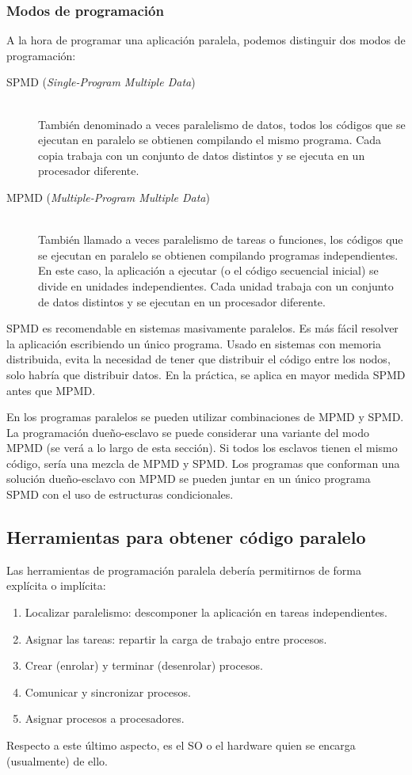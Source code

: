 \subsubsection{Modos de programación}
A la hora de programar una aplicación paralela, podemos distinguir dos modos de programación:
\begin{description}
    \item [SPMD (\emph{Single-Program Multiple Data})]~\\
        También denominado a veces paralelismo de datos, todos los códigos que se ejecutan en paralelo se obtienen compilando el mismo programa. Cada copia trabaja con un conjunto de datos distintos y se ejecuta en un procesador diferente.
    \item [MPMD (\emph{Multiple-Program Multiple Data})]~\\
        También llamado a veces paralelismo de tareas o funciones, los códigos que se ejecutan en paralelo se obtienen compilando programas independientes. En este caso, la aplicación a ejecutar (o el código secuencial inicial) se divide en unidades independientes. Cada unidad trabaja con un conjunto de datos distintos y se ejecutan en un procesador diferente.
\end{description}

SPMD es recomendable en sistemas masivamente paralelos. Es más fácil resolver la aplicación escribiendo un único programa. Usado en sistemas con memoria distribuida, evita la necesidad de tener que distribuir el código entre los nodos, solo habría que distribuir datos. En la práctica, se aplica en mayor medida SPMD antes que MPMD.

En los programas paralelos se pueden utilizar combinaciones de MPMD y SPMD\@. La programación dueño-esclavo se puede considerar una variante del modo MPMD (se verá a lo largo de esta sección). Si todos los esclavos tienen el mismo código, sería una mezcla de MPMD y SPMD\@. Los programas que conforman una solución dueño-esclavo con MPMD se pueden juntar en un único programa SPMD con el uso de estructuras condicionales.

\subsection{Herramientas para obtener código paralelo}
Las herramientas de programación paralela debería permitirnos de forma explícita o implícita:
\begin{enumerate}
    \item Localizar paralelismo: descomponer la aplicación en tareas independientes.
    \item Asignar las tareas: repartir la carga de trabajo entre procesos.
    \item Crear (enrolar) y terminar (desenrolar) procesos.
    \item Comunicar y sincronizar procesos.
    \item Asignar procesos a procesadores.
\end{enumerate}
Respecto a este último aspecto, es el SO o el hardware quien se encarga (usualmente) de ello.\\

